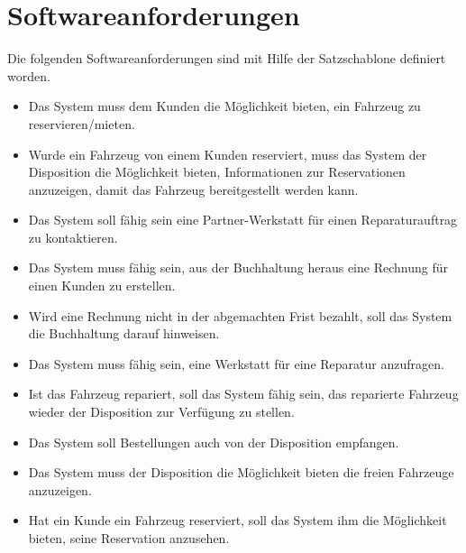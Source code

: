 \section{Softwareanforderungen}
Die folgenden Softwareanforderungen sind mit Hilfe der Satzschablone definiert worden.
\begin{itemize}
\item Das System muss dem Kunden die Möglichkeit bieten, ein Fahrzeug zu reservieren/mieten.
%
\item Wurde ein Fahrzeug von einem Kunden reserviert, muss das System der Disposition die Möglichkeit bieten, Informationen zur Reservationen anzuzeigen, damit das Fahrzeug bereitgestellt werden kann.
%
\item Das System soll fähig sein eine Partner-Werkstatt für einen Reparaturauftrag zu kontaktieren.
%
\item Das System muss fähig sein, aus der Buchhaltung heraus eine Rechnung für einen Kunden zu erstellen.
%
\item Wird eine Rechnung nicht in der abgemachten Frist bezahlt, soll das System die Buchhaltung darauf hinweisen. 
%
\item Das System muss fähig sein, eine Werkstatt für eine Reparatur anzufragen.
%
\item Ist das Fahrzeug repariert, soll das System fähig sein, das reparierte Fahrzeug wieder der Disposition zur Verfügung  zu stellen.
%
\item Das System soll Bestellungen auch von der Disposition empfangen.
%
\item Das System muss der Disposition die Möglichkeit bieten die freien Fahrzeuge anzuzeigen.
%
\item Hat ein Kunde ein Fahrzeug reserviert, soll das System ihm die Möglichkeit bieten, seine Reservation anzusehen.
\end{itemize}
\newpage
